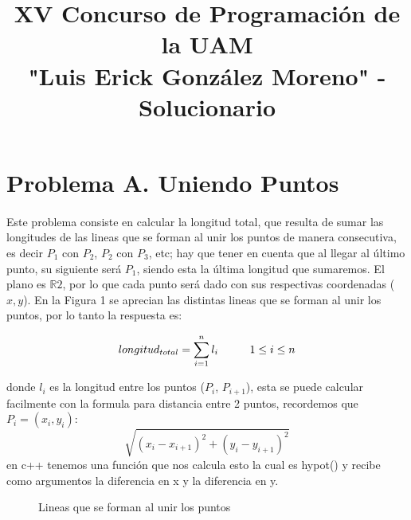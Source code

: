 \documentclass[12pt]{article}
\author{}
\title{XV Concurso de Programación de la UAM \\ 
"Luis Erick González Moreno" - Solucionario}
\begin{document}
    \maketitle
    \newpage %
    
    \section*{Problema A. Uniendo Puntos}
    \paragraph{}
    \singlespacing
    Este problema consiste en calcular la longitud total, que resulta de sumar las longitudes de las 
    lineas que se forman al unir los puntos de manera consecutiva, es decir $P_{1}$ con $P_{2}$, $P_{2}$ con $P_{3}$, etc;
    hay que tener en cuenta que al llegar al último punto, su siguiente 
    será $P_{1}$, siendo esta la última longitud que sumaremos. El plano es $\mathbb{R}2$, por lo que cada punto será
    dado con sus respectivas coordenadas ($x, y$). En la Figura 1 se aprecian las distintas lineas que se forman al unir los puntos,
    por lo tanto la respuesta es: 
    
    \begin{equation}
        longitud_{total} = \sum_{i=1}^{n} l_{i} \hspace{10mm} 1 \leq i \leq n
    \end{equation}
    \vspace{2mm}

    donde $l_{i}$ es la longitud entre los puntos ($P_{i}$, $P_{i+1}$),
    esta se puede calcular facilmente con la formula para distancia entre 2 puntos, recordemos que $P_{i} = (x_{i},y_{i})$:
    \begin{equation}
        \sqrt{(x_{i} - x_{i+1})^2 + (y_{i} - y_{i+1})^2}
    \end{equation}
    en c++ tenemos una función que nos calcula esto
    la cual es hypot() y recibe como argumentos la diferencia en x y la diferencia en y.
     
    \begin{figure}[h]
        \centering
        \caption{Lineas que se forman al unir los puntos}
    \end{figure}
\end{document}
